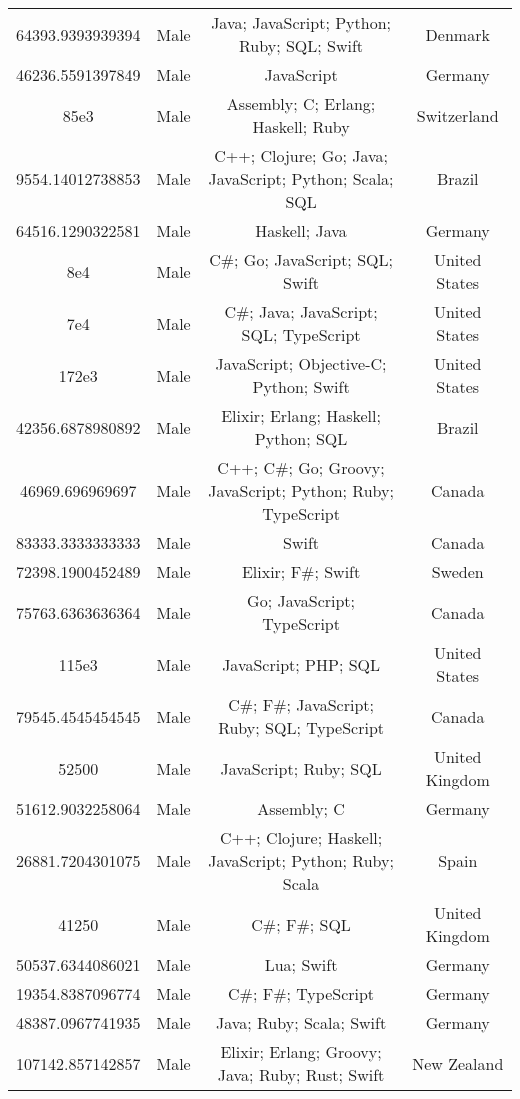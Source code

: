 \begin{center}
\begin{tabular}{ |c|c|c|c| }
64393.9393939394  &  Male  &  Java; JavaScript; Python; Ruby; SQL; Swift  &  Denmark  \\ 
46236.5591397849  &  Male  &  JavaScript  &  Germany  \\ 
85e3  &  Male  &  Assembly; C; Erlang; Haskell; Ruby  &  Switzerland  \\ 
9554.14012738853  &  Male  &  C++; Clojure; Go; Java; JavaScript; Python; Scala; SQL  &  Brazil  \\ 
64516.1290322581  &  Male  &  Haskell; Java  &  Germany  \\ 
8e4  &  Male  &  C\#; Go; JavaScript; SQL; Swift  &  United States  \\ 
7e4  &  Male  &  C\#; Java; JavaScript; SQL; TypeScript  &  United States  \\ 
172e3  &  Male  &  JavaScript; Objective-C; Python; Swift  &  United States  \\ 
42356.6878980892  &  Male  &  Elixir; Erlang; Haskell; Python; SQL  &  Brazil  \\ 
46969.696969697  &  Male  &  C++; C\#; Go; Groovy; JavaScript; Python; Ruby; TypeScript  &  Canada  \\ 
83333.3333333333  &  Male  &  Swift  &  Canada  \\ 
72398.1900452489  &  Male  &  Elixir; F\#; Swift  &  Sweden  \\ 
75763.6363636364  &  Male  &  Go; JavaScript; TypeScript  &  Canada  \\ 
115e3  &  Male  &  JavaScript; PHP; SQL  &  United States  \\ 
79545.4545454545  &  Male  &  C\#; F\#; JavaScript; Ruby; SQL; TypeScript  &  Canada  \\ 
52500  &  Male  &  JavaScript; Ruby; SQL  &  United Kingdom  \\ 
51612.9032258064  &  Male  &  Assembly; C  &  Germany  \\ 
26881.7204301075  &  Male  &  C++; Clojure; Haskell; JavaScript; Python; Ruby; Scala  &  Spain  \\ 
41250  &  Male  &  C\#; F\#; SQL  &  United Kingdom  \\ 
50537.6344086021  &  Male  &  Lua; Swift  &  Germany  \\ 
19354.8387096774  &  Male  &  C\#; F\#; TypeScript  &  Germany  \\ 
48387.0967741935  &  Male  &  Java; Ruby; Scala; Swift  &  Germany  \\ 
107142.857142857  &  Male  &  Elixir; Erlang; Groovy; Java; Ruby; Rust; Swift  &  New Zealand  \\ 

\end{tabular}
\end{center}
